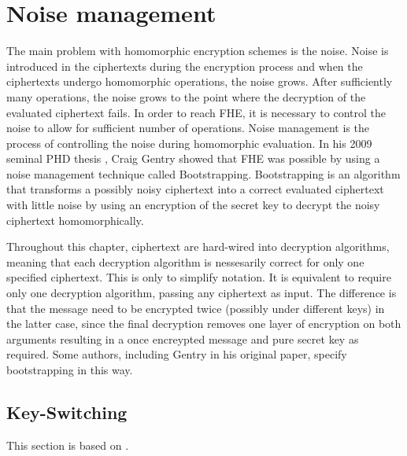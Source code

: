 \chapter{Noise management}
\label{chp:noise}

The main problem with homomorphic encryption schemes is the noise. Noise is introduced in the ciphertexts during the encryption process and when the ciphertexts undergo homomorphic operations, the noise grows. After sufficiently many operations, the noise grows to the point where the decryption of the evaluated ciphertext fails. In order to reach FHE, it is necessary to control the noise to allow for sufficient number of operations. Noise management is the process of controlling the noise during homomorphic evaluation. In his 2009 seminal PHD thesis \cite{Gentry-Thesis}, Craig Gentry showed that FHE was possible by using a noise management technique called Bootstrapping. Bootstrapping is an algorithm that transforms a possibly noisy ciphertext into a correct evaluated ciphertext with little noise by using an encryption of the secret key to decrypt the noisy ciphertext homomorphically.

Throughout this chapter, ciphertext are hard-wired into decryption algorithms, meaning that each decryption algorithm is nessesarily correct for only one specified ciphertext. This is only to simplify notation. It is equivalent to require only one decryption algorithm, passing any ciphertext as input. The difference is that the message need to be encrypted twice (possibly under different keys) in the latter case, since the final decryption removes one layer of encryption on both arguments resulting in a once encreypted message and pure secret key as required. Some authors, including Gentry in his original paper, specify bootstrapping in this way. 

\section{Key-Switching}
This section is based on \cite{Bra18-survey}.

